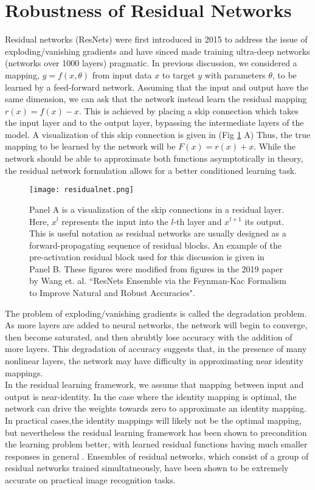\documentclass[12pt]{article}
\begin{document}
\section{Robustness of Residual Networks}
Residual networks (ResNets) were first introduced in 2015 to address the issue of exploding/vanishing gradients and have sinced made training ultra-deep networks (networks over 1000 layers) pragmatic. In previous discussion, we considered a mapping, $y = f(x,\theta)$ from input data $x$ to target $y$ with parameters $\theta$, to be learned by a feed-forward network. Assuming that the input and output have the same dimension, we can ask that the network instead learn the residual mapping $r(x) = f(x)-x$. This is achieved by placing a skip connection which takes the input layer and to the output layer, bypassing the intermediate layers of the model. A visualization of this skip connection is given in (Fig \ref{fig:resnet} A) Thus, the true mapping to be learned by the network will be $F(x) = r(x) + x$. While the network should be able to approximate both functions asymptotically in theory, the residual network formulation allows for a better conditioned learning task. \\
\begin{figure}
  \centering
  \texttt{[image: residualnet.png]}
  \caption{Panel A is a visualization of the skip connections in a residual layer. Here, $x^l$ represents the input into the $l$-th layer and $x^{l+1}$ its output. This is useful notation as residual networks are usually designed as a forward-propagating sequence of residual blocks. An example of the pre-activation residual block used for this discussion is given in Panel B. These figures were modified from figures in the 2019 paper by Wang et. al. ``ResNets Ensemble via the Feynman-Kac Formalism to Improve Natural and Robust Accuracies"\cite{res}.}
  \label{fig:resnet}
\end{figure}
\indent The problem of exploding/vanishing gradients is called the degradation problem. As more layers are added to neural networks, the network will begin to converge, then become saturated, and then abrubtly lose accuracy with the addition of more layers. This degradation of accuracy suggests that, in the presence of many nonlinear layers, the network may have difficulty in approximating near identity mappings. \\
\indent In the residual learning framework, we assume that mapping between input and output is near-identity. In the case where the identity mapping is optimal, the network can drive the weights towards zero to approximate an identity mapping. In practical cases,the identity mappings will likely not be the optimal mapping, but nevertheless the residual learning framework has been shown to precondition the learning problem better, with learned residual functions having much smaller responses in general \cite{res}. Ensembles of residual networks, which consist of a group of residual networks trained simultatneously, have been shown to be extremely accurate on practical image recognition tasks.
\end{document}
